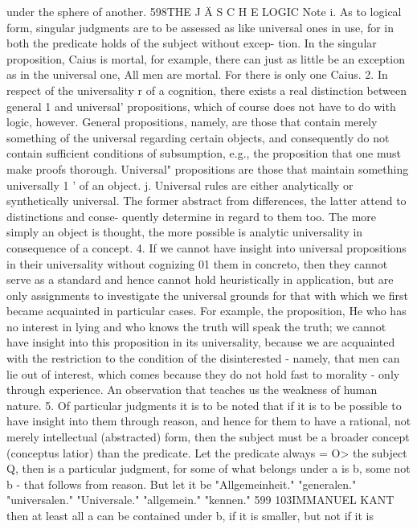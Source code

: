 under the sphere of another.
598THE J Ä S C H E LOGIC
Note i. As to logical form, singular judgments are to be assessed as like universal
ones in use, for in both the predicate holds of the subject without excep-
tion. In the singular proposition, Caius is mortal, for example, there can
just as little be an exception as in the universal one, All men are mortal.
For there is only one Caius.
2. In respect of the universality r of a cognition, there exists a real distinction
between general 1 and universal' propositions, which of course does not
have to do with logic, however. General propositions, namely, are those
that contain merely something of the universal regarding certain objects,
and consequently do not contain sufficient conditions of subsumption,
e.g., the proposition that one must make proofs thorough. Universal"
propositions are those that maintain something universally 1 ' of an object.
j. Universal rules are either analytically or synthetically universal. The former
abstract from differences, the latter attend to distinctions and conse-
quently determine in regard to them too. The more simply an object is
thought, the more possible is analytic universality in consequence of a
concept.
4. If we cannot have insight into universal propositions in their universality
without cognizing 01 them in concreto, then they cannot serve as a standard
and hence cannot hold heuristically in application, but are only assignments
to investigate the universal grounds for that with which we first became
acquainted in particular cases. For example, the proposition, He who has no
interest in lying and who knows the truth will speak the truth; we cannot have
insight into this proposition in its universality, because we are acquainted
with the restriction to the condition of the disinterested - namely, that
men can lie out of interest, which comes because they do not hold fast to
morality - only through experience. An observation that teaches us the
weakness of human nature.
5. Of particular judgments it is to be noted that if it is to be possible to have
insight into them through reason, and hence for them to have a rational,
not merely intellectual (abstracted) form, then the subject must be a
broader concept (conceptus latior) than the predicate. Let the predicate
always = O> the subject Q, then
is a particular judgment, for some of what belongs under a is b, some not
b - that follows from reason. But let it be
"Allgemeinheit."
"generalen."
"universalen."
"Universale."
"allgemein."
"kennen."
599
103IMMANUEL KANT
then at least all a can be contained under b, if it is smaller, but not if it is
